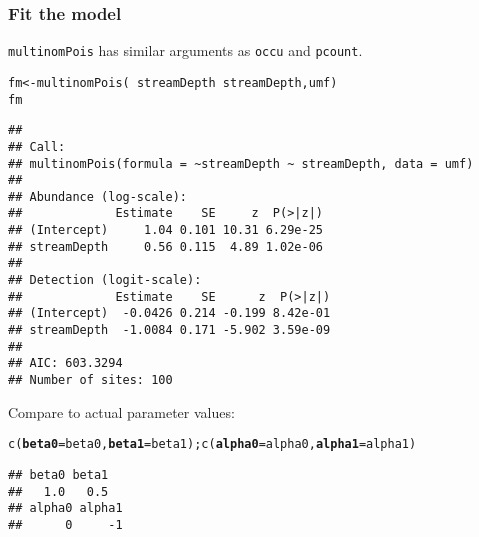 \documentclass[color=usenames,dvipsnames]{beamer}\usepackage[]{graphicx}\usepackage[]{xcolor}
\makeatletter
\newcommand{\hlopt}[1]{\textcolor[rgb]{0,0,0}{#1}}%
\newcommand{\hldef}[1]{\textcolor[rgb]{0,0,0}{#1}}%
\newcommand{\hlkwb}[1]{\textcolor[rgb]{0,0.341,0.682}{#1}}%
\newcommand{\hlkwc}[1]{\textcolor[rgb]{0,0,0}{\textbf{#1}}}%
\newcommand{\hlkwd}[1]{\textcolor[rgb]{0.004,0.004,0.506}{#1}}%
\newenvironment{kframe}{%
 \def\at@end@of@kframe{}%
 \ifinner\ifhmode%
  \def\at@end@of@kframe{\end{minipage}}%
  \begin{minipage}{\columnwidth}%
 \fi\fi%
 \def\FrameCommand##1{\hskip\@totalleftmargin \hskip-\fboxsep
 \colorbox{shadecolor}{##1}\hskip-\fboxsep
     \hskip-\linewidth \hskip-\@totalleftmargin \hskip\columnwidth}%
 \MakeFramed {\advance\hsize-\width
   \@totalleftmargin\z@ \linewidth\hsize
   \@setminipage}}%
 {\par\unskip\endMakeFramed%
 \at@end@of@kframe}
\newenvironment{knitrout}{}{} %
\newcommand{\inr}[1]{\colorbox{inlinecolor}{\texttt{#1}}}
\makeatother
\begin{document}
\begin{frame}[fragile]
  \frametitle{Fit the model}
  \footnotesize
  \inr{multinomPois} has similar arguments as \inr{occu} and
  \inr{pcount}. 
\begin{knitrout}\tiny
{}\color{fgcolor}\begin{kframe}
\begin{alltt}
\hldef{fm} \hlkwb{<-} \hlkwd{multinomPois}\hldef{(}\hlopt{~}\hldef{streamDepth} \hlopt{~}\hldef{streamDepth, umf)}
\hldef{fm}
\end{alltt}
\begin{verbatim}
## 
## Call:
## multinomPois(formula = ~streamDepth ~ streamDepth, data = umf)
## 
## Abundance (log-scale):
##             Estimate    SE     z  P(>|z|)
## (Intercept)     1.04 0.101 10.31 6.29e-25
## streamDepth     0.56 0.115  4.89 1.02e-06
## 
## Detection (logit-scale):
##             Estimate    SE      z  P(>|z|)
## (Intercept)  -0.0426 0.214 -0.199 8.42e-01
## streamDepth  -1.0084 0.171 -5.902 3.59e-09
## 
## AIC: 603.3294 
## Number of sites: 100
\end{verbatim}
\end{kframe}
\end{knitrout}
\pause
\vfill
Compare to actual parameter values:
\vspace{-6pt}
\begin{knitrout}\tiny
{}\color{fgcolor}\begin{kframe}
\begin{alltt}
\hlkwd{c}\hldef{(}\hlkwc{beta0}\hldef{=beta0,} \hlkwc{beta1}\hldef{=beta1);} \hlkwd{c}\hldef{(}\hlkwc{alpha0}\hldef{=alpha0,} \hlkwc{alpha1}\hldef{=alpha1)}
\end{alltt}
\begin{verbatim}
## beta0 beta1 
##   1.0   0.5
## alpha0 alpha1 
##      0     -1
\end{verbatim}
\end{kframe}
\end{knitrout}
\end{frame}
\end{document}
